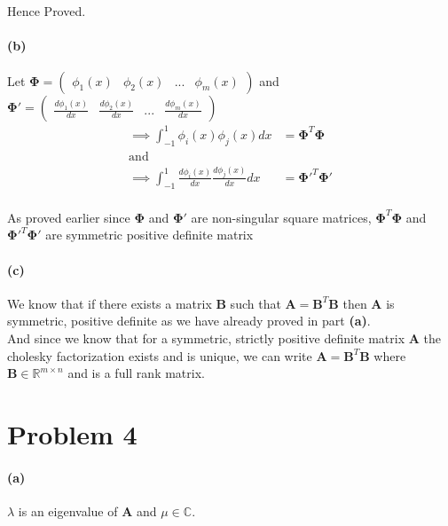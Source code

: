 \documentclass[12pt, letterpaper]{article}
\begin{document}
Hence Proved.

\paragraph{(b)}
Let $\mathbf{\Phi} = \begin{pmatrix} \phi_1(x) & \phi_2(x) & ... & \phi_m(x) \end{pmatrix}$
and $\mathbf{\Phi}' = \begin{pmatrix} \frac{d\phi_1(x)}{dx} & \frac{d\phi_2(x)}{dx} & ... & \frac{d\phi_m(x)}{dx} \end{pmatrix}$
\begin{align*}
  \implies \int_{-1}^1 \phi_i(x)\phi_j(x)dx &= \mathbf{\Phi}^T\mathbf{\Phi}\\
  \text{and}&\\
  \implies \int_{-1}^1 \frac{d\phi_i(x)}{dx}\frac{d\phi_j(x)}{dx}dx &= \mathbf{\Phi'}^T\mathbf{\Phi'}\\
\end{align*}

As proved earlier since $\mathbf{\Phi}$ and $\mathbf{\Phi}'$ are non-singular square matrices, $\mathbf{\Phi}^T\mathbf{\Phi}$ and  $\mathbf{\Phi}'^T\mathbf{\Phi'}$ are symmetric positive definite matrix

\paragraph{(c)}

We know that if there exists a matrix $\mathbf{B}$ such that $\mathbf{A} = \mathbf{B}^T\mathbf{B}$ then $\mathbf{A}$ is symmetric, positive definite as we have already proved in part \textbf{(a)}.\\

And since we know that for a symmetric, strictly positive definite matrix $\mathbf{A}$ the cholesky factorization exists and is unique, we can write $\mathbf{A} = \mathbf{B}^T\mathbf{B}$ where $\mathbf{B} \in \mathbb{R}^{m \times n}$ and is a full rank matrix.

\pagebreak
\section*{Problem 4}
\label{sec:prob4}

\paragraph{(a)} $\lambda$ is an eigenvalue of $\mathbf{A}$ and $\mu \in \mathbb{C}$.
\end{document}
